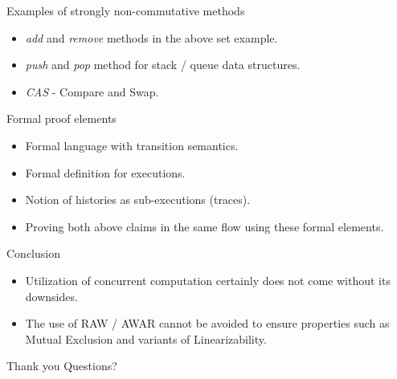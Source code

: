 \documentclass[notes, xcolor=dvipsnames]{beamer}
\begin{document}
    \begin{frame}{Examples of strongly non-commutative methods}

        \begin{itemize}
            \item \textit{add} and \textit{remove} methods in the above set example.
            \item \textit{push} and \textit{pop} method for stack / queue data structures.
            \item \textit{CAS} - Compare and Swap.  
        \end{itemize}
    \end{frame}

    \begin{frame}{Formal proof elements}
        
        \begin{itemize}
            \item Formal language with transition semantics.
            \item Formal definition for executions.
            \item Notion of histories as sub-executions (traces).
            \item Proving both above claims in the same flow using these formal elements. 
        \end{itemize}

    \end{frame}
    
    \begin{frame}{Conclusion}
        
        \begin{itemize}
            \item Utilization of concurrent computation certainly does not come without its downsides.
            \item The use of RAW / AWAR cannot be avoided to ensure properties such as Mutual Exclusion and variants of Linearizability.
        \end{itemize}
        

    \end{frame}

    \begin{frame}{Thank you}
        Questions? 
    \end{frame}
\end{document}
